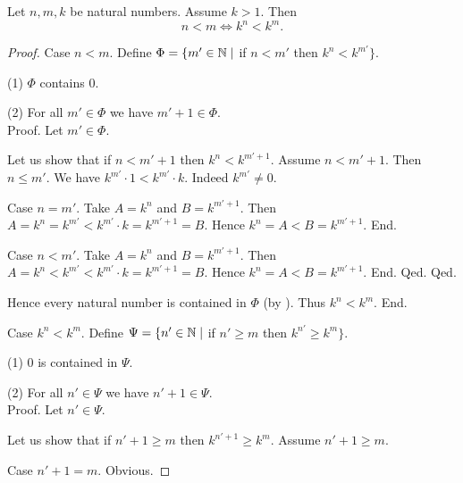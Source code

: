 \documentclass[10pt]{article}
\begin{document}
  \begin{forthel}
    \begin{proposition}[id=ARITHMETIC_09_3349764703780864,printid]
      Let $n, m, k$ be natural numbers.
      Assume $k > 1$.
      Then \[ n < m \iff k^{n} < k^{m}. \]
    \end{proposition}
    \begin{proof}
      Case $n < m$.
        Define $\Phi = \{ m' \in \mathbb{N} \mid$ if $n < m'$ then $k^{n} < k^{m'} \}$.

        (1) $\Phi$ contains $0$.

        (2) For all $m' \in \Phi$ we have $m' + 1 \in \Phi$. \\
        Proof.
          Let $m' \in \Phi$.

          Let us show that if $n < m' + 1$ then $k^{n} < k^{m' + 1}$.
            Assume $n < m' + 1$.
            Then $n \leq m'$.
            We have $k^{m'} \cdot 1 < k^{m'} \cdot k$.
            Indeed $k^{m'} \neq 0$.

            Case $n = m'$.
              Take $A = k^{n}$ and $B = k^{m' + 1}$. %
              Then $A
                = k^{n}
                = k^{m'}
                < k^{m'} \cdot k
                = k^{m' + 1}
                = B$.
              Hence $k^{n} = A < B = k^{m' + 1}$.
            End.

            Case $n < m'$.
              Take $A = k^{n}$ and $B = k^{m' + 1}$. %
              Then $A
                = k^{n}
                < k^{m'}
                < k^{m'} \cdot k
                = k^{m' + 1}
                = B$.
              Hence $k^{n} = A < B = k^{m' + 1}$.
            End.
          Qed.
        Qed.

        Hence every natural number is contained in $\Phi$ (by ).
        Thus $k^{n} < k^{m}$.
      End.

      Case $k^{n} < k^{m}$.
        Define $\Psi = \{ n' \in \mathbb{N} \mid$ if $n' \geq m$ then
        $k^{n'} \geq k^{m} \}$.

        (1) $0$ is contained in $\Psi$.

        (2) For all $n' \in \Psi$ we have $n' + 1 \in \Psi$. \\
        Proof.
          Let $n' \in \Psi$.

          Let us show that if $n' + 1 \geq m$ then $k^{n' + 1} \geq k^{m}$.
            Assume $n' + 1 \geq m$.

            Case $n' + 1 = m$. Obvious.


\end{proof}
\end{forthel}
\end{document}
